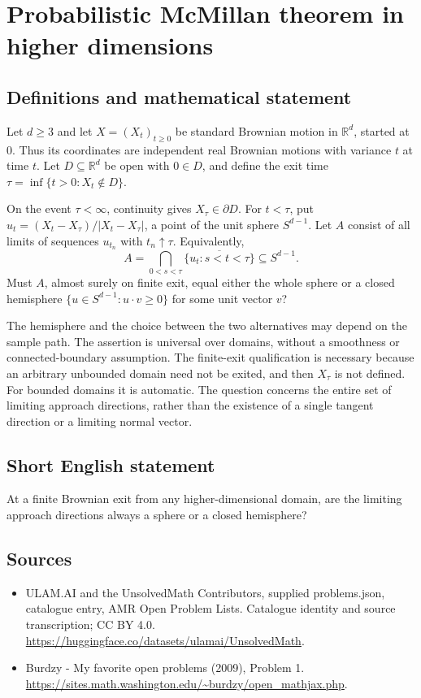 \documentclass[11pt,a4paper]{article}
\begin{document}
\section*{Probabilistic McMillan theorem in higher dimensions}\label{statement}

\subsection{Definitions and mathematical statement}
Let $d\ge3$ and let $X=(X_t)_{t\ge0}$ be standard Brownian motion in $\mathbb R^d$, started at $0$. Thus its coordinates are independent real Brownian motions with variance $t$ at time $t$. Let $D\subseteq\mathbb R^d$ be open with $0\in D$, and define the exit time $\tau=\inf\{t>0:X_t\notin D\}$.

On the event $\tau<\infty$, continuity gives $X_\tau\in\partial D$. For $t<\tau$, put $u_t=(X_t-X_\tau)/|X_t-X_\tau|$, a point of the unit sphere $S^{d-1}$. Let $A$ consist of all limits of sequences $u_{t_n}$ with $t_n\uparrow\tau$. Equivalently,
\[
A=\bigcap_{0<s<\tau}\overline{\{u_t:s<t<\tau\}}\subseteq S^{d-1}.
\]
Must $A$, almost surely on finite exit, equal either the whole sphere or a closed hemisphere $\{u\in S^{d-1}:u\cdot v\ge0\}$ for some unit vector $v$?

The hemisphere and the choice between the two alternatives may depend on the sample path. The assertion is universal over domains, without a smoothness or connected-boundary assumption. The finite-exit qualification is necessary because an arbitrary unbounded domain need not be exited, and then $X_\tau$ is not defined. For bounded domains it is automatic. The question concerns the entire set of limiting approach directions, rather than the existence of a single tangent direction or a limiting normal vector.
\subsection{Short English statement}
At a finite Brownian exit from any higher-dimensional domain, are the limiting approach directions always a sphere or a closed hemisphere?
\subsection{Sources}
\begin{itemize}
\item[S1] ULAM.AI and the UnsolvedMath Contributors, supplied problems.json, catalogue entry, AMR Open Problem Lists. Catalogue identity and source transcription; CC BY 4.0.
\url{https://huggingface.co/datasets/ulamai/UnsolvedMath}.
\item[S2] Burdzy - My favorite open problems (2009), Problem 1. 
\url{https://sites.math.washington.edu/~burdzy/open_mathjax.php}.
\end{itemize}
\end{document}
